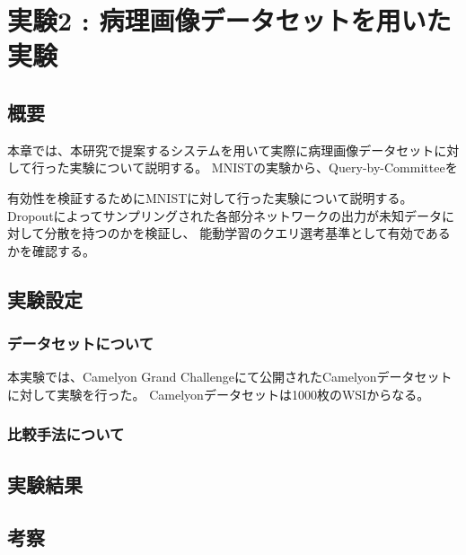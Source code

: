 \chapter{実験2 : 病理画像データセットを用いた実験}
\section{概要}
本章では、本研究で提案するシステムを用いて実際に病理画像データセットに対して行った実験について説明する。
MNISTの実験から、Query-by-Committeeを

有効性を検証するためにMNISTに対して行った実験について説明する。
Dropoutによってサンプリングされた各部分ネットワークの出力が未知データに対して分散を持つのかを検証し、
能動学習のクエリ選考基準として有効であるかを確認する。
\section{実験設定}
\subsection{データセットについて}
本実験では、Camelyon Grand Challenge\cite{Camelyon17}にて公開されたCamelyonデータセットに対して実験を行った。
Camelyonデータセットは1000枚のWSIからなる。

\subsection{比較手法について}

\section{実験結果}

\section{考察}
